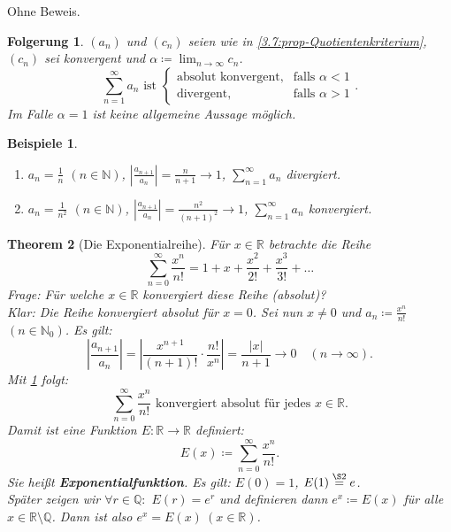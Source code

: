 \documentclass[12pt]{extreport} %
\newcommand{\N}{\mathbb{N}}
\newcommand{\Q}{\mathbb{Q}}
\newcommand{\R}{\mathbb{R}}
\theoremstyle{named}
\newtheorem{unnamedtheorem}{Theorem} \counterwithin{unnamedtheorem}{chapter}
\theoremstyle{itshape}
\theoremstyle{normal}
\newtheorem{folgerung}[unnamedtheorem]{Folgerung}
\newtheorem*{beispiele}{Beispiele}
\begin{document}
Ohne Beweis.

\begin{folgerung} \label{3.8:folg}
	$(a_{n})$ und $(c_{n})$ seien wie in \ref{3.7:prop-Quotientenkriterium}, $(c_{n})$ sei konvergent und $\alpha \coloneqq \lim_{n \to\infty} c_{n}$.
	$$ \sum_{n=1}^{\infty} a_{n} \text{ ist } \begin{cases} \text{absolut konvergent}, & \text{falls } \alpha < 1 \\ \text{divergent}, & \text{falls } \alpha > 1 \end{cases}. $$
	Im Falle $\alpha = 1$ ist keine allgemeine Aussage möglich.
\end{folgerung}


\begin{beispiele} ~\
	\begin{enumerate}
		\item $a_{n} = \frac{1}{n}$ $(n \in \N)$, $\left| \frac{a_{n+1}}{a_{n}} \right| = \frac{n}{n+1} \rightarrow 1$, $\sum_{n=1}^{\infty} a_{n}$ divergiert.
		\item $a_{n} = \frac{1}{n^{2}}$ $(n \in \N)$, $\left| \frac{a_{n+1}}{a_{n}} \right| = \frac{n^{2}}{(n+1)^{2}} \rightarrow 1$, $\sum_{n=1}^{\infty} a_{n}$ konvergiert.
	\end{enumerate}	
\end{beispiele}

 
\begin{unnamedtheorem}[Die Exponentialreihe] \label{3.9:prop-Exponentialreihe}
	Für $x \in \R$ betrachte die Reihe 
	$$ \sum_{n=0}^{\infty} \frac{x^{n}}{n!} = 1 + x + \frac{x^{2}}{2!} + \frac{x^{3}}{3!} + \dotsc $$
	Frage: Für welche $x \in \R$ konvergiert diese Reihe (absolut)? \\
	Klar: Die Reihe konvergiert absolut für $x = 0$. Sei nun $x \ne 0$ und $a_{n} \coloneqq \frac{x^{n}}{n!}$ $(n \in \N_0)$. Es gilt:
		$$ \left| \frac{a_{n+1}}{a_{n}} \right| = \left| \frac{x^{n+1}}{(n+1)!} \cdot \frac{n!}{x^{n}} \right| = \frac{|x|}{n+1} \rightarrow 0 \quad (n \rightarrow \infty). $$
	Mit \ref{3.8:folg} folgt:
		$$ \sum_{n=0}^{\infty} \frac{x^{n}}{n!} \text{ konvergiert absolut für jedes } x \in \R. $$
	Damit ist eine Funktion $E \colon \R \rightarrow \R$ definiert:
		$$ E(x) \coloneqq \sum_{n=0}^{\infty} \frac{x^{n}}{n!}. $$
	Sie hei{\ss}t \textbf{Exponentialfunktion}. Es gilt: $E(0) = 1$, $E(1) \overset{\S 2}{=} e$. \\
	Später zeigen wir $\forall r \in \Q:$ $E(r) = e^{r}$ und definieren dann $e^{x} \coloneqq E(x)$ für alle $x \in \R \setminus \Q$. 
	Dann ist also $e^{x} = E(x) ~ (x \in \R)$.
\end{unnamedtheorem}
\end{document}
